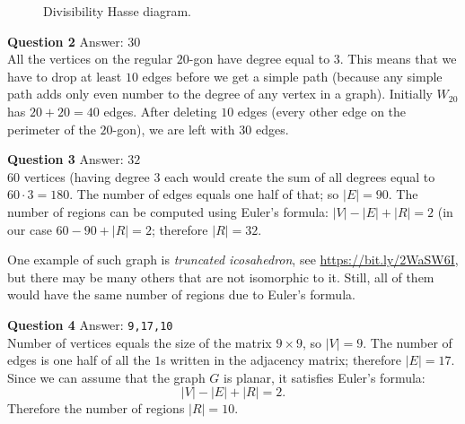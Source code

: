 \documentclass[jou]{apa6}
\begin{document}
\begin{figure}[!htb]
\caption{\label{fig:divisibility-144-graph} Divisibility Hasse diagram.}
\end{figure}




\vspace{10pt}
{\bf Question 2} Answer: $30$\\
All the vertices on the regular $20$-gon have degree equal to $3$. 
This means that we have to drop at least $10$ edges before we 
get a simple path (because any simple path adds only even number to the degree
of any vertex in a graph). Initially $W_{20}$ has $20 + 20 = 40$ edges. 
After deleting $10$ edges (every other edge on the perimeter of the $20$-gon), 
we are left with $30$ edges.


\vspace{10pt}
{\bf Question 3} Answer: $32$\\
$60$ vertices (having degree $3$ each would create the sum of all degrees equal to $60 \cdot 3 = 180$. 
The number of edges equals one half of that; so $|E| = 90$. The number of regions
can be computed using Euler's formula: $|V| - |E| + |R| = 2$ (in our case 
$60 - 90 + |R| = 2$; therefore $|R| = 32$. 

One example of such graph is {\em truncated icosahedron}, see \url{https://bit.ly/2WaSW6I}, 
but there may be many others that are not isomorphic to it. Still, all of them 
would have the same number of regions due to Euler's formula.

\vspace{10pt}
{\bf Question 4} Answer: {\tt 9,17,10}\\
Number of vertices equals the size of the matrix $9 \times 9$, 
so $|V| = 9$. The number of edges is one half of all the $1$s written 
in the adjacency matrix; therefore $|E| = 17$. Since we can assume
that the graph $G$ is planar, it satisfies Euler's formula:
$$|V| - |E| + |R| = 2.$$
Therefore the number of regions $|R| = 10$. 
\end{document}
